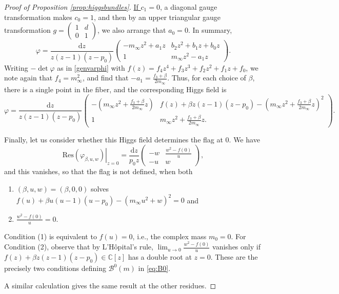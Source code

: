 \documentclass[12pt,letterpaper,reqno]{amsart}
\def\mathbf#1{#1}%
\theoremstyle{remark}
\theoremstyle{definition}
\numberwithin{thm}{section}
\numberwithin{equation}{section}
\numberwithin{figure}{section}
\newcommand{\C}{\ensuremath{\mathbb C}}
\newcommand{\de}{\mathrm{d}}
\begin{document}
\begin{proof}[Proof of Proposition \ref{prop:higgsbundles}]
\smallskip

\noindent \underline{If $c_1 = 0$}, a diagonal gauge transformation makes $c_0=1$, and then by an upper triangular gauge transformation 
$g= \begin{pmatrix} 1 & d \\ 0 & 1 \end{pmatrix}$, we also arrange that $a_0=0$.  In summary, 
\begin{equation}
 \varphi = \frac{\de z}{z(z-1)(z-p_0)}\begin{pmatrix}  -m_\infty z^2 + a_1 z & b_2 z^2 + b_1 z + b_0 z \\  1 & m_\infty z^2  - a_1 z \end{pmatrix}.
\end{equation}
Writing $-\det \varphi$ as in \eqref{genvarphi}  
with $f(z) = f_4 z^4 + f_3 z^3 + f_2 z^2 + f_1 z + f_0$, we note again that $f_4=m_\infty^2$, and find that $-a_1=\frac{f_3 + \beta}{2 m_\infty}$.
Thus, for each choice of $\beta$, there is a single point in the fiber, and the corresponding Higgs field is
\begin{equation}
 \varphi = \frac{\de z}{z(z-1)(z-p_0)}\begin{pmatrix} -(m_\infty z^2 +
            \frac{f_3 + \beta}{2 m_\infty} z)& f(z) + \beta z(z-1)(z-p_0) 
            -\left(m_\infty z^2 +
            \frac{f_3 + \beta}{2 m_\infty} z\right)^2 \\ 1 & m_\infty z^2 +
            \frac{f_3 + \beta}{2 m_\infty} z.
           \end{pmatrix}.
\end{equation}

\medskip

Finally, let us consider whether this Higgs field determines the flag at $0$. We have
\begin{equation}
\left.\mathrm{Res}(\varphi_{\beta, u,w})\right|_{z=0}= \frac{\de z}{p_0 z}  \begin{pmatrix} 
-w& \frac{w^2-f(0)}{u}\\  -u &w \end{pmatrix},
\end{equation}
and this vanishes, so that the flag is not defined, when both
\begin{enumerate}
 \item $(\beta, u, w)=(\beta, 0, 0)$ solves $f(u)+\beta u(u-1)(u-p_0)-(m_\infty u^2 + w)^2=0$ and 
 \item $\frac{w^2-f(0)}{u}=0$.
\end{enumerate}
Condition (1) is equivalent to $f(u)=0$, i.e., the complex mass $m_0=0$. For Condition (2), observe that by L'H\^{o}pital's rule, $\lim_{u \to 0}\frac{w^2-f(0)}{u}$ 
vanishes only if $f(z) + \beta z(z-1)(z-p_0) \in \C[z]$ has a double root at $z=0$. These are the precisely two conditions defining $\mathcal{B}^0(\mathbf{m})$ in \eqref{eq:B0}.

A similar calculation gives the same result at the other residues.
\end{proof}
\end{document}
